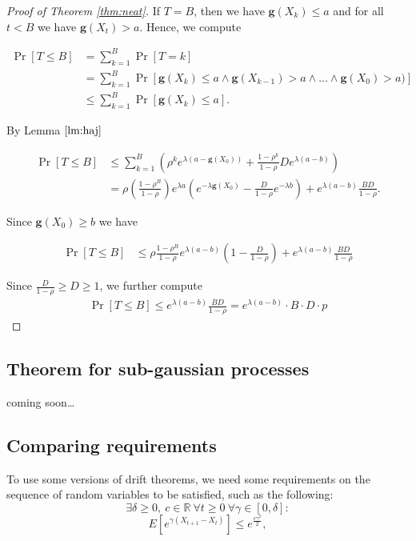 \documentclass[12pt, a4paper]{article}
\newcommand{\gfun}{\mathbf{g}}
\theoremstyle{remark}
\newcommand{\cm}{coming soon\dots}
\begin{document}
\begin{proof}[Proof of Theorem \ref{thm:neat}]
    
    If $T = B$, then we have $\gfun(X_k) \leq a$ and for all $t < B$ we have $\gfun(X_t) > a$. Hence, we compute

    \begin{align*}
        \Pr[T \leq B] &= \sum_{k=1}^{B} \Pr[T = k] \\
        &= \sum_{k=1}^{B} \Pr[\gfun(X_k) \leq a \land \gfun(X_{k - 1}) > a \land ... \land \gfun(X_0) > a)] \\
        & \leq \sum_{k=1}^{B} \Pr[\gfun(X_k) \leq a].
    \end{align*}

    By Lemma $\ref{lm:haj}$

    \begin{align*}
        \Pr[T \leq B] & \leq \sum_{k=1}^{B} \left(\rho^k e^{\lambda(a - \gfun(X_0))} + \frac{1 - \rho^k}{1 - \rho} D e^{\lambda(a - b)}\right)\\
        & = \rho \left(\frac{1 - \rho^B}{1 - \rho}\right) e^{\lambda a}\left(e^{-\lambda\gfun(X_0)} - \frac{D}{1 - \rho} e^{-\lambda b}\right) + e^{\lambda(a - b)} \frac{B D}{1 - \rho}.
    \end{align*}

    Since $\gfun(X_0) \ge b$ we have

    \begin{align*}
        \Pr[T \leq B] & \leq \rho \frac{1 - \rho^B}{1 - \rho} e^{\lambda (a - b)}\left(1 - \frac{D}{1 - \rho}\right) + e^{\lambda(a - b)} \frac{B D}{1 - \rho}
    \end{align*}
    
    Since $\frac{D}{1 - \rho} \geq D \geq 1 $, we further compute
    \begin{align*}
        \Pr[T \leq B] \leq e^{\lambda(a - b)} \frac{B D}{1 - \rho} = e^{\lambda(a - b)} \cdot B \cdot D \cdot p
    \end{align*}

\end{proof}
\subsection{Theorem for sub-gaussian processes}
\cm
\subsection{Comparing requirements}
To use some versions of drift theorems, we need some requirements on the sequence of random variables to be satisfied, such as the following:
$$
\exists \delta \geq 0,\ c \in \mathbb{R} \ \forall  t \geq 0 \ \forall \gamma \in [0, \delta]: $$$$
E\left[e^{\gamma (X_{t + 1} - X_{t})}\right] \leq e^{\frac{c \gamma^2}{2}},$$
\end{document}
